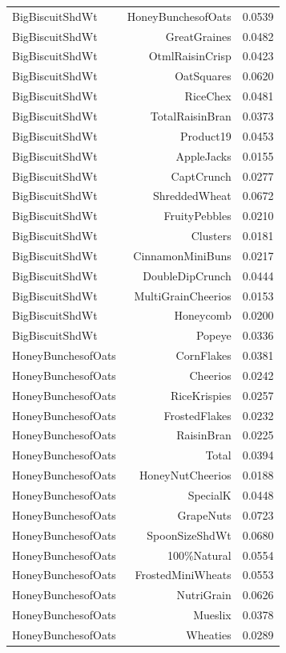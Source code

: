 \begin{longtable}{@{}lrr@{}}
BigBiscuitShdWt & HoneyBunchesofOats & 0.0539 \\
BigBiscuitShdWt & GreatGraines & 0.0482 \\
BigBiscuitShdWt & OtmlRaisinCrisp & 0.0423 \\
BigBiscuitShdWt & OatSquares & 0.0620 \\
BigBiscuitShdWt & RiceChex & 0.0481 \\
BigBiscuitShdWt & TotalRaisinBran & 0.0373 \\
BigBiscuitShdWt & Product19 & 0.0453 \\
BigBiscuitShdWt & AppleJacks & 0.0155 \\
BigBiscuitShdWt & CaptCrunch & 0.0277 \\
BigBiscuitShdWt & ShreddedWheat & 0.0672 \\
BigBiscuitShdWt & FruityPebbles & 0.0210 \\
BigBiscuitShdWt & Clusters & 0.0181 \\
BigBiscuitShdWt & CinnamonMiniBuns & 0.0217 \\
BigBiscuitShdWt & DoubleDipCrunch & 0.0444 \\
BigBiscuitShdWt & MultiGrainCheerios & 0.0153 \\
BigBiscuitShdWt & Honeycomb & 0.0200 \\
BigBiscuitShdWt & Popeye & 0.0336 \\
HoneyBunchesofOats & CornFlakes & 0.0381 \\
HoneyBunchesofOats & Cheerios & 0.0242 \\
HoneyBunchesofOats & RiceKrispies & 0.0257 \\
HoneyBunchesofOats & FrostedFlakes & 0.0232 \\
HoneyBunchesofOats & RaisinBran & 0.0225 \\
HoneyBunchesofOats & Total & 0.0394 \\
HoneyBunchesofOats & HoneyNutCheerios & 0.0188 \\
HoneyBunchesofOats & SpecialK & 0.0448 \\
HoneyBunchesofOats & GrapeNuts & 0.0723 \\
HoneyBunchesofOats & SpoonSizeShdWt & 0.0680 \\
HoneyBunchesofOats & 100\%Natural & 0.0554 \\
HoneyBunchesofOats & FrostedMiniWheats & 0.0553 \\
HoneyBunchesofOats & NutriGrain & 0.0626 \\
HoneyBunchesofOats & Mueslix & 0.0378 \\
HoneyBunchesofOats & Wheaties & 0.0289 \\

\end{longtable}
